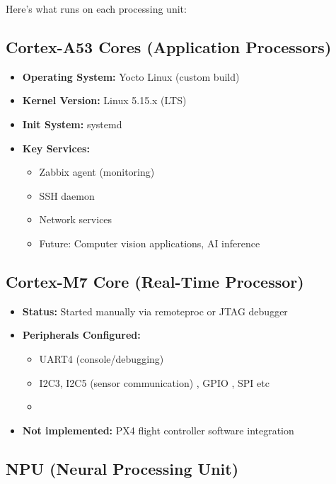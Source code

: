 \documentclass[12pt,a4paper]{report}
\begin{document}
Here's what runs on each processing unit:

\subsection{Cortex-A53 Cores (Application Processors)}

\begin{itemize}
    \item \textbf{Operating System:} Yocto Linux (custom build)
    \item \textbf{Kernel Version:} Linux 5.15.x (LTS)
    \item \textbf{Init System:} systemd
    \item \textbf{Key Services:}
    \begin{itemize}
        \item Zabbix agent (monitoring)
        \item SSH daemon
        \item Network services
        \item Future: Computer vision applications, AI inference
    \end{itemize}
\end{itemize}

\subsection{Cortex-M7 Core (Real-Time Processor)}

\begin{itemize}
    \item \textbf{Status:} Started manually via remoteproc or JTAG debugger
    \item \textbf{Peripherals Configured:}
    \begin{itemize}
        \item UART4 (console/debugging)
        \item I2C3, I2C5 (sensor communication) , GPIO , SPI etc
        \item 
    \end{itemize}
    \item \textbf{Not implemented:} PX4 flight controller software integration
\end{itemize}

\subsection{NPU (Neural Processing Unit)}
\end{document}
